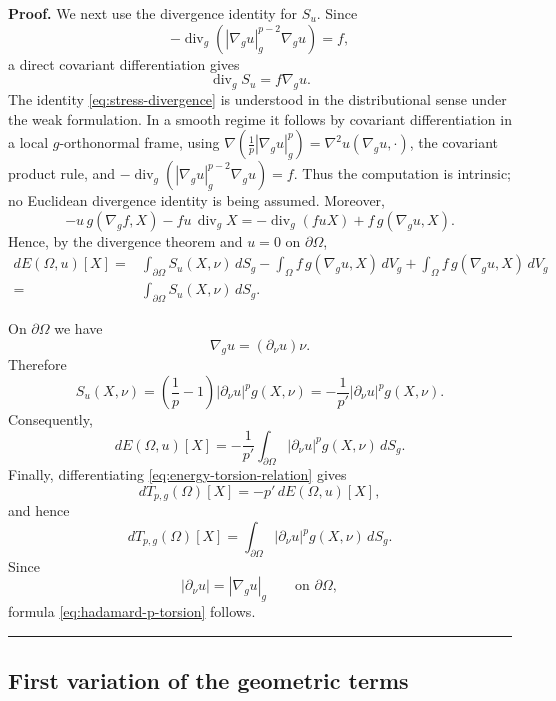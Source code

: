 \documentclass{article}
\newenvironment{proof}[1][Proof]{\textbf{#1.} }{\hfill\rule{0.5em}{0.5em}}
\begin{document}
\begin{proof}
We next use the divergence identity for $S_u$. Since
\[
-\operatorname{div}_g
\left(
|\nabla_g u|_g^{p-2}\nabla_g u
\right)
=f,
\]
a direct covariant differentiation gives
\begin{equation}
\operatorname{div}_g S_u
=
f\nabla_g u.
\label{eq:stress-divergence}
\end{equation}
The identity \eqref{eq:stress-divergence} is understood in the distributional sense under the weak formulation. In a smooth regime it follows by covariant differentiation in a local $g$-orthonormal frame, using
$\nabla(\frac1p|\nabla_g u|_g^p)=\nabla^2u(\nabla_g u,\cdot)$,
the covariant product rule, and
$-\operatorname{div}_g(|\nabla_g u|_g^{p-2}\nabla_g u)=f$.
Thus the computation is intrinsic; no Euclidean divergence identity is being assumed.
Moreover,
\[
-u\,g(\nabla_gf,X)-fu\,\operatorname{div}_gX
=
-\operatorname{div}_g(fuX)
+
f\,g(\nabla_g u,X).
\]
Hence, by the divergence theorem and $u=0$ on $\partial\Omega$,
\begin{align}
dE(\Omega,u)[X]
={}&
\int_{\partial\Omega}S_u(X,\nu)\,dS_g
-
\int_\Omega f\,g(\nabla_g u,X)\,dV_g
+
\int_\Omega f\,g(\nabla_g u,X)\,dV_g
\nonumber\\
={}&
\int_{\partial\Omega}S_u(X,\nu)\,dS_g.
\label{eq:energy-boundary-representation}
\end{align}

On $\partial\Omega$ we have
\[
\nabla_g u=(\partial_\nu u)\nu.
\]
Therefore
\[
S_u(X,\nu)
=
\left(\frac1p-1\right)
|\partial_\nu u|^p g(X,\nu)
=
-\frac1{p'}
|\partial_\nu u|^p g(X,\nu).
\]
Consequently,
\begin{equation}
dE(\Omega,u)[X]
=
-\frac1{p'}
\int_{\partial\Omega}
|\partial_\nu u|^p g(X,\nu)\,dS_g.
\label{eq:energy-hadamard-p}
\end{equation}
Finally, differentiating \eqref{eq:energy-torsion-relation} gives
\[
dT_{p,g}(\Omega)[X]
=
-p'\,dE(\Omega,u)[X],
\]
and hence
\[
dT_{p,g}(\Omega)[X]
=
\int_{\partial\Omega}
|\partial_\nu u|^p g(X,\nu)\,dS_g.
\]
Since
\[
|\partial_\nu u|
=
|\nabla_g u|_g
\qquad\text{on }\partial\Omega,
\]
formula \eqref{eq:hadamard-p-torsion} follows.
\end{proof}

\subsection{First variation of the geometric terms}
\end{document}
